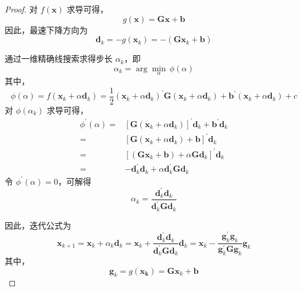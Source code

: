 \documentclass[cn]{elegantbook}
\begin{document}
\begin{proof}
    对 $f(\mathbf{x})$ 求导可得，
    \begin{equation}
        g(\mathbf{x})=\mathbf{G}\mathbf{x}+\mathbf{b}
    \end{equation}
    因此，最速下降方向为
    \begin{equation}
        \mathbf{d}_{k}=-g(\mathbf{x}_{k})=-\left(\mathbf{G}\mathbf{x}_{k}+\mathbf{b}\right)
    \end{equation}

    通过一维精确线搜索求得步长 $\alpha_{k}$，即
    \begin{equation}
        \alpha_{k}=\arg\min_{\alpha}\,\phi(\alpha)
    \end{equation}
    其中，
    \begin{equation}
        \phi(\alpha)=f(\mathbf{x}_{k}+\alpha\mathbf{d}_{k})=\frac{1}{2}\left(\mathbf{x}_{k}+\alpha\mathbf{d}_{k}\right)^{\prime}\mathbf{G}\left(\mathbf{x}_{k}+\alpha\mathbf{d}_{k}\right)+\mathbf{b}^{\prime}\left(\mathbf{x}_{k}+\alpha\mathbf{d}_{k}\right)+c
    \end{equation}
    对 $\phi(\alpha_{k})$ 求导可得，
    \begin{equation}
        \begin{aligned}
            \phi^{\prime}(\alpha)= & \left[\mathbf{G}\left(\mathbf{x}_{k}+\alpha\mathbf{d}_{k}\right)\right]^{\prime}\mathbf{d}_{k}+\mathbf{b}^{\prime}\mathbf{d}_{k} \\
            =                      & \left[\mathbf{G}\left(\mathbf{x}_{k}+\alpha\mathbf{d}_{k}\right)+\mathbf{b}\right]^{\prime}\mathbf{d}_{k}                        \\
            =                      & \left[\left(\mathbf{G}\mathbf{x}_{k}+\mathbf{b}\right)+\alpha\mathbf{G}\mathbf{d}_{k}\right]^{\prime}\mathbf{d}_{k}              \\
            =                      & -\mathbf{d}_{k}^{\prime}\mathbf{d}_{k}+\alpha\mathbf{d}_{k}^{\prime}\mathbf{G}\mathbf{d}_{k}
        \end{aligned}
    \end{equation}
    令 $\phi^{\prime}(\alpha)=0$，可解得
    \begin{equation}
        \alpha_{k}=\frac{\mathbf{d}_{k}^{\prime}\mathbf{d}_{k}}{\mathbf{d}_{k}^{\prime}\mathbf{G}\mathbf{d}_{k}}
    \end{equation}

    因此，迭代公式为
    \begin{equation}
        \mathbf{x}_{k+1}=\mathbf{x}_{k}+\alpha_{k}\mathbf{d}_{k}=\mathbf{x}_{k}+\frac{\mathbf{d}_{k}^{\prime}\mathbf{d}_{k}}{\mathbf{d}_{k}^{\prime}\mathbf{G}\mathbf{d}_{k}}\mathbf{d}_{k}=\mathbf{x}_{k}-\frac{\mathbf{g}_{k}^{\prime}\mathbf{g}_{k}}{\mathbf{g}_{k}^{\prime}\mathbf{G}\mathbf{g}_{k}}\mathbf{g}_{k}
    \end{equation}
    其中，
    \begin{equation}
        \mathbf{g}_{k}=g(\mathbf{x_{k}})=\mathbf{G}\mathbf{x}_{k}+\mathbf{b}
    \end{equation}
\end{proof}
\end{document}

